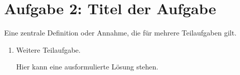 \documentclass[11pt,a4paper]{scrartcl}
\theoremstyle{definition}
\theoremstyle{plain}
\theoremstyle{remark}
\begin{document}
\FloatBarrier
\newpage

\section{Aufgabe 2: Titel der Aufgabe}

\begin{definitionbox}
    Eine zentrale Definition oder Annahme, die für mehrere Teilaufgaben gilt.
\end{definitionbox}

\begin{enumerate}[label=(\alph*)]
    \item Weitere Teilaufgabe.
    \begin{solutionbox}
        Hier kann eine ausformulierte Lösung stehen.
    \end{solutionbox}
\end{enumerate}
\end{document}
